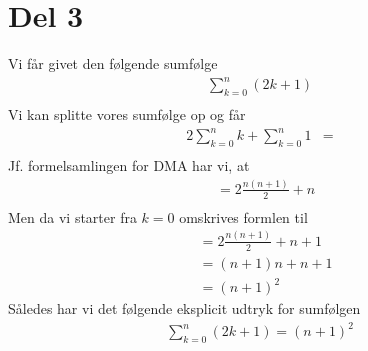 \documentclass[a4paper]{article}
\begin{document}
\section*{Del 3}
Vi får givet den følgende sumfølge
\begin{align*}
\sum_{k=0}^{n} (2k+1) \\
\end{align*}
Vi kan splitte vores sumfølge op og får 
\begin{align*}
2\sum_{k=0}^{n}k + \sum_{k=0}^{n} 1 &=\\ 
\end{align*}
Jf. formelsamlingen for DMA har vi, at
\begin{align*}
&= 2\frac{n(n+1)}{2}+n \\
\end{align*}
Men da vi starter fra $k=0$ omskrives formlen til 
\begin{align*}
&= 2\frac{n(n+1)}{2}+n+1 \\
&= (n+1)n+n+1 \\
&= (n+1)^2
\end{align*}
Således har vi det følgende eksplicit udtryk for sumfølgen
\begin{align*}
\sum_{k=0}^{n} (2k+1) = (n+1)^2
\end{align*}
\end{document}
